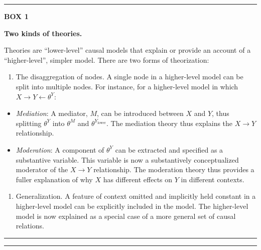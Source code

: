 \documentclass[12pt,]{book}
\providecommand{\tightlist}{%
  \setlength{\itemsep}{0pt}\setlength{\parskip}{0pt}}
\begin{document}
\begin{center}\rule{0.5\linewidth}{\linethickness}\end{center}

\textbf{BOX 1}

\textbf{Two kinds of theories.}

Theories are ``lower-level'' causal models that explain or provide an account of a ``higher-level'', simpler model. There are two forms of theorization:

\begin{enumerate}
\def\labelenumi{\arabic{enumi}.}
\tightlist
\item
  The disaggregation of nodes. A single node in a higher-level model can be split into multiple nodes. For instance, for a higher-level model in which \(X \rightarrow Y \leftarrow \theta^Y\):
\end{enumerate}

\begin{itemize}
\tightlist
\item
  \emph{Mediation}: A mediator, \(M\), can be introduced between \(X\) and \(Y\), thus splitting \(\theta^Y\) into \(\theta^M\) and \(\theta^{Y_\text{lower}}\). The mediation theory thus explains the \(X \rightarrow Y\) relationship.
\item
  \emph{Moderation}: A component of \(\theta^Y\) can be extracted and specified as a substantive variable. This variable is now a substantively conceptualized moderator of the \(X \rightarrow Y\) relationship. The moderation theory thus provides a fuller explanation of why \(X\) has different effects on \(Y\) in different contexts.
\end{itemize}

\begin{enumerate}
\def\labelenumi{\arabic{enumi}.}
\setcounter{enumi}{1}
\tightlist
\item
  Generalization. A feature of context omitted and implicitly held constant in a higher-level model can be explicitly included in the model. The higher-level model is now explained as a special case of a more general set of causal relations.
\end{enumerate}

\begin{center}\rule{0.5\linewidth}{\linethickness}\end{center}

\begin{center}\rule{0.5\linewidth}{\linethickness}\end{center}
\end{document}
